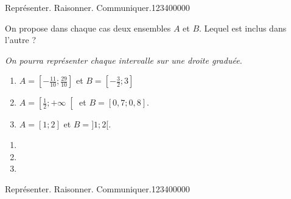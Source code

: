 \begin{pageParcoursd}
\begin{ExoCd}{Représenter. Raisonner. Communiquer.}{1234}{0}{0}{0}{0}{0}

On propose dans chaque cas deux ensembles $A$ et $B$. Lequel est inclus dans l'autre ?  

\textit{{\small On pourra représenter chaque intervalle sur une droite graduée.}}

\begin{minipage}{0.48\linewidth}

 
\begin{enumerate}
\item $A = \left[ -\frac{11}{10};\frac{29}{10}\right]$ et $B=\left[-\frac{3}{2};3 \right]$
\item $A =\left[ \frac{1}{2}; +\infty \right[$ et $B=[0,7;0,8]$.
\item $A =[1;2]$ et $B=]1;2[$. 
\end{enumerate}

\end{minipage}
\hfill
\begin{minipage}{0.48\linewidth}
 
\begin{enumerate}

\item

\item

\item

\end{enumerate}

\end{minipage} 
\end{ExoCd}

\begin{ExoCd}{Représenter. Raisonner. Communiquer.}{1234}{0}{0}{0}{0}{0}


\end{ExoCd}
\end{pageParcoursd}
